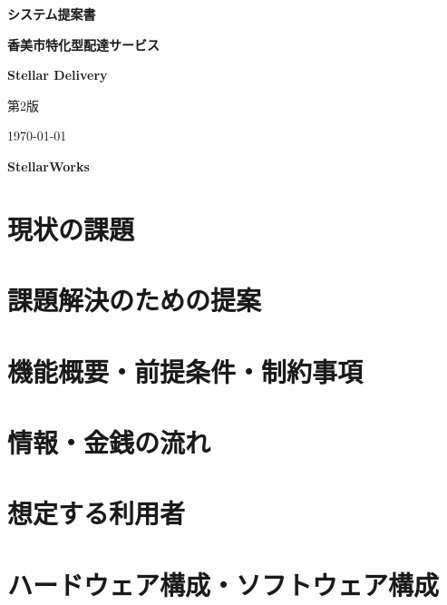 \documentclass{jlreq}
\begin{document}
\begin{titlepage}
  \centering
  \vspace{2cm}
  {\LARGE \bfseries システム提案書 \par}
  \vspace{1cm}
  {\LARGE \bfseries 香美市特化型配達サービス \par}
  \vspace{1cm}
   {\LARGE \bfseries Stellar Delivery \par}
  \vspace{3cm}
  {\Large 第2版 \par}
  \vspace{4cm}
  {\Large \today \par}
  \vspace{0.5cm}
  {\LARGE \bfseries StellarWorks \par}
  \vfill
\end{titlepage}

\newpage

\tableofcontents
\newpage


\section{現状の課題}


\section{課題解決のための提案}


\section{機能概要・前提条件・制約事項}


\section{情報・金銭の流れ}


\section{想定する利用者}


\section{ハードウェア構成・ソフトウェア構成}

\end{document}
